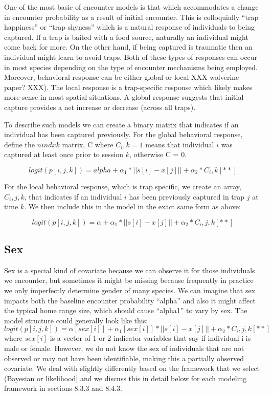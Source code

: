 One of the most basic of encounter models is that which accommodates a
change in encounter probability as a result of initial encounter.
This is colloquially ``trap happiness'' or ``trap shyness'' which is a
natural response of individuals to being captured. If a trap is baited
with a food source, naturally an individual might come back for
more. On the other hand, if being captured is traumatic then an
individual might learn to avoid traps. Both of these types of
responses can occur in most species depending on the type of encounter
mechanisms being employed. Moreover, behavioral response can be either
global \citep{gardner_etal:2010} or local \citep{royle_etal:2009} XXX wolverine paper? XXX).  The local response is a trap-specific response which likely makes more sense in most spatial situations. A global response suggests that initial capture provides a net increase or decrease (across all traps). 

To describe such models we can create a binary matrix that indicates if an individual has been captured previously.  For the global behavioral response, define the $nind x k$ matrix, C where $C_i,k =1$ means that individual $i$ was captured at least once prior to session $k$, otherwise C = 0.  

        \[
	logit(p[i,j,k]) = alpha + \alpha_1 *||s[i]-x[j]|| + \alpha_2*C_i,k	[**]
        \]

For the local behavioral response, which is trap specific, we create an array, $C_i,j,k$, that indicates if an individual $i$ has been previously captured in trap $j$ at time $k$.  We then include this in the model in the exact same form as above:

       \[
	logit(p[i,j,k]) = \alpha + \alpha_1*||s[i]-x[j]|| + \alpha_2*C_i,j,k	[**]
        \]


\subsection{Sex}

Sex is a special kind of covariate because we can observe it for those individuals we encounter, but sometimes it might be missing because frequently in practice we only imperfectly determine gender of many species. We can imagine that sex impacts both the baseline encounter probability ``alpha'' and also it might affect the typical home range size, which should cause ``alpha1'' to vary by sex.  The model structure could generally look like this:
       \[
	logit(p[i,j,k]) = \alpha[sex[i]] + \alpha_1[sex[i]]*||s[i]-x[j]|| + \alpha_2*C_i,j,k	[**]
        \]
where $sex[i]$ is a vector of 1 or 2 indicator variables that say if individual i is male or female.  However, we do not know the sex of individuals that are not observed or may not have been identifiable, making this a partially observed covariate.  We deal with slightly differently based on the framework that we select (Bayesian or likelihood] and we discuss this in detail below for each modeling framework in sections 8.3.3 and 8.4.3.
 



